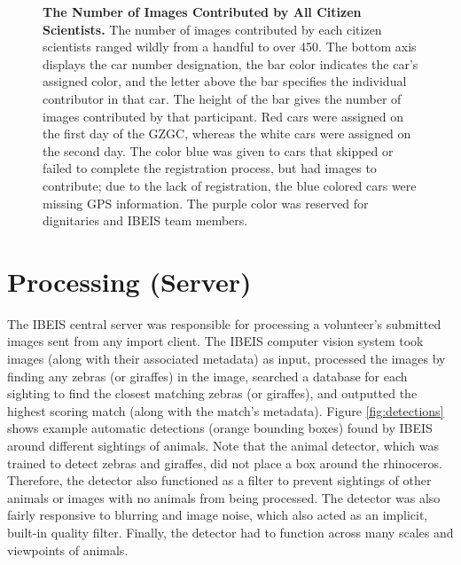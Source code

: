 \begin{figure}[t]%
    \centering
        \caption[The Number of Images Contributed by All Citizen Scientists]{\textbf{The Number of Images Contributed by All Citizen Scientists.}  The number of images contributed by each citizen scientists ranged wildly from a handful to over 450.  The bottom axis displays the car number designation, the bar color indicates the car's assigned color, and the letter above the bar specifies the individual contributor in that car.  The height of the bar gives the number of images contributed by that participant.  Red cars were assigned on the first day of the GZGC, whereas the white cars were assigned on the second day.  The color blue was given to cars that skipped or failed to complete the registration process, but had images to contribute; due to the lack of registration, the blue colored cars were missing GPS information.  The purple color was reserved for dignitaries and IBEIS team members.}
        \label{fig:contributions}
\end{figure}

\section{Processing (Server)}
The IBEIS central server was responsible for processing a volunteer's submitted images sent from any import client.  The IBEIS computer vision system took images (along with their associated metadata) as input, processed the images by finding any zebras (or giraffes) in the image, searched a database for each sighting to find the closest matching zebras (or giraffes), and outputted the highest scoring match (along with the match's metadata).  Figure \ref{fig:detections} shows example automatic detections (orange bounding boxes) found by IBEIS around different sightings of animals.  Note that the animal detector, which was trained to detect zebras and giraffes, did not place a box around the rhinoceros.  Therefore, the detector also functioned as a filter to prevent sightings of other animals or images with no animals from being processed.  The detector was also fairly responsive to blurring and image noise, which also acted as an implicit, built-in quality filter.  Finally, the detector had to function across many scales and viewpoints of animals.

